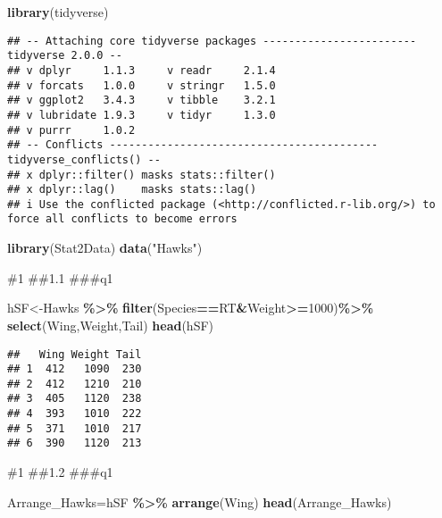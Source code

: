 \documentclass[
]{article}
\author{}
\date{\vspace{-2.5em}}
\newenvironment{Shaded}{\begin{snugshade}}{\end{snugshade}}
\newcommand{\DecValTok}[1]{\textcolor[rgb]{0.00,0.00,0.81}{#1}}
\newcommand{\FunctionTok}[1]{\textcolor[rgb]{0.13,0.29,0.53}{\textbf{#1}}}
\newcommand{\NormalTok}[1]{#1}
\newcommand{\OtherTok}[1]{\textcolor[rgb]{0.56,0.35,0.01}{#1}}
\newcommand{\SpecialCharTok}[1]{\textcolor[rgb]{0.81,0.36,0.00}{\textbf{#1}}}
\newcommand{\StringTok}[1]{\textcolor[rgb]{0.31,0.60,0.02}{#1}}
\begin{document}
\begin{Shaded}
\begin{Highlighting}[]
\FunctionTok{library}\NormalTok{(tidyverse)}
\end{Highlighting}
\end{Shaded}

\begin{verbatim}
## -- Attaching core tidyverse packages ------------------------ tidyverse 2.0.0 --
## v dplyr     1.1.3     v readr     2.1.4
## v forcats   1.0.0     v stringr   1.5.0
## v ggplot2   3.4.3     v tibble    3.2.1
## v lubridate 1.9.3     v tidyr     1.3.0
## v purrr     1.0.2     
## -- Conflicts ------------------------------------------ tidyverse_conflicts() --
## x dplyr::filter() masks stats::filter()
## x dplyr::lag()    masks stats::lag()
## i Use the conflicted package (<http://conflicted.r-lib.org/>) to force all conflicts to become errors
\end{verbatim}

\begin{Shaded}
\begin{Highlighting}[]
\FunctionTok{library}\NormalTok{(Stat2Data)}
\FunctionTok{data}\NormalTok{(}\StringTok{"Hawks"}\NormalTok{)}
\end{Highlighting}
\end{Shaded}

\#1 \#\#1.1 \#\#\#q1

\begin{Shaded}
\begin{Highlighting}[]
\NormalTok{hSF}\OtherTok{\textless{}{-}}\NormalTok{Hawks }\SpecialCharTok{\%\textgreater{}\%}
  \FunctionTok{filter}\NormalTok{(Species}\SpecialCharTok{==}\StringTok{\textquotesingle{}RT\textquotesingle{}}\SpecialCharTok{\&}\NormalTok{Weight}\SpecialCharTok{\textgreater{}=}\DecValTok{1000}\NormalTok{)}\SpecialCharTok{\%\textgreater{}\%}
  \FunctionTok{select}\NormalTok{(Wing,Weight,Tail)}
\FunctionTok{head}\NormalTok{(hSF)}
\end{Highlighting}
\end{Shaded}

\begin{verbatim}
##   Wing Weight Tail
## 1  412   1090  230
## 2  412   1210  210
## 3  405   1120  238
## 4  393   1010  222
## 5  371   1010  217
## 6  390   1120  213
\end{verbatim}

\#1 \#\#1.2 \#\#\#q1

\begin{Shaded}
\begin{Highlighting}[]
\NormalTok{Arrange\_Hawks}\OtherTok{=}\NormalTok{hSF }\SpecialCharTok{\%\textgreater{}\%}
  \FunctionTok{arrange}\NormalTok{(Wing)}
\FunctionTok{head}\NormalTok{(Arrange\_Hawks)}
\end{Highlighting}
\end{Shaded}
\end{document}
